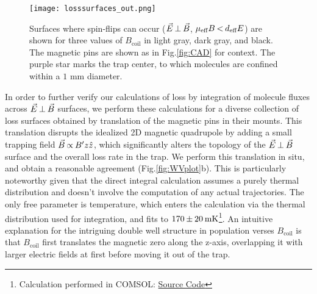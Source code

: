 \documentclass[%
 reprint,
 amsmath,amssymb,
 aps,
prl,
]{revtex4-1}
\newcommand{\bcl}{{$B_\text{coil}$}}
\newcommand{\epb}{{$\vec{E}\s {\perp}\s\vec{B}$}}
\newcommand{\s}{{\nobreak\hspace{.2em}}}
\begin{document}
\begin{figure}[tb]
\texttt{[image: losssurfaces\_out.png]}%
\caption{
Surfaces where spin-flips can occur (\epb{}, $\mu_\text{eff}B\s {<}\s d_\text{eff}E$) are shown for three values of \bcl{} in light gray, dark gray, and black. 
The magnetic pins are shown as in Fig.\s\ref{fig:CAD} for context. 
The purple star marks the trap center, to which molecules are confined within a \raisebox{2.5px}{\texttildelow} $\!\!1\text{ mm}$ diameter.
\label{fig:LSurfs}}
\end{figure}

In order to further verify our calculations of loss by integration of molecule fluxes across \epb{} surfaces, we perform these calculations for a diverse collection of loss surfaces obtained by translation of the magnetic pins in their mounts. 
This translation disrupts the idealized 2D magnetic quadrupole by adding a small trapping field $\vec{B} \s {\propto}\s  B^\prime z\hat{z}$, which significantly alters the topology of the \epb{} surface and the overall loss rate in the trap.
We perform this translation in situ, and obtain a reasonable agreement (Fig.\s\ref{fig:WVplot}b). 
This is particularly noteworthy given that the direct integral calculation assumes a purely thermal distribution and doesn't involve the computation of any actual trajectories.
The only free parameter is temperature, which enters the calculation via the thermal distribution used for integration, and fits to $170\s {\pm}\s 20\s\text{mK}$\s\footnote{Calculation performed in COMSOL: \href{https://github.com/dreens/spin-flip-integration/}{Source Code}}.
An intuitive explanation for the intriguing double well structure in population verses \bcl{} is that \bcl{} first translates the magnetic zero along the z-axis, overlapping it with larger electric fields at first before moving it out of the trap.
\end{document}
